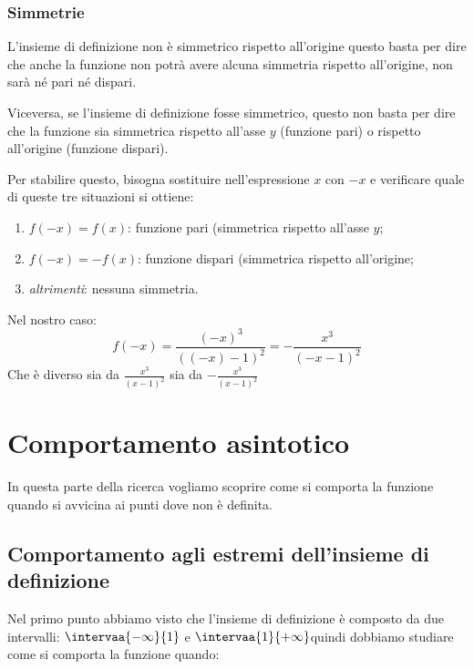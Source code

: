 \subsubsection{Simmetrie}

L'insieme di definizione non è simmetrico rispetto all'origine questo basta 
per dire che anche la funzione non potrà avere alcuna simmetria rispetto 
all'origine, non sarà né pari né dispari.

Viceversa, se l'insieme di definizione fosse simmetrico, questo non basta per 
dire che la funzione sia simmetrica rispetto all'asse \(y\) 
(funzione pari) o rispetto all'origine (funzione dispari).

Per stabilire questo, bisogna sostituire nell'espressione \(x\) con \(-x\) e 
verificare quale di queste tre situazioni si ottiene:

\begin{enumerate} [nosep]
 \item \(f(-x)=f(x)\): funzione pari (simmetrica rispetto all'asse \(y\);
 \item \(f(-x)=-f(x)\): funzione dispari (simmetrica rispetto all'origine;
 \item \emph{altrimenti}: nessuna simmetria.
\end{enumerate}

Nel nostro caso: 
\[f(-x)=\frac{(-x)^3}{((-x)-1)^2} = -\frac{x^3}{(-x-1)^2}\]
Che è diverso sia da 
\(\frac{x^3}{(x-1)^2}\)
sia da
\(-\frac{x^3}{(x-1)^2}\)


\section{Comportamento asintotico}
\label{sec:comportamentoasintotico}

In questa parte della ricerca vogliamo scoprire come si comporta la funzione 
quando si avvicina ai punti dove non è definita.

\subsection{Comportamento agli estremi dell'insieme di definizione}

Nel primo punto abbiamo visto che l'insieme di definizione è composto da due 
intervalli: \(\intervaa{-\infty}{1}\) e \(\intervaa{1}{+\infty}\)quindi 
dobbiamo studiare come si comporta la funzione quando:

